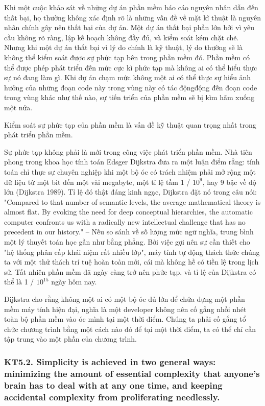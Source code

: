 \documentclass[12pt]{report}
\begin{document}

Khi một cuộc khảo sát về những dự án phần mềm báo cáo nguyên nhân dẫn đến thất bại, họ thường không xác định rõ là những vấn đề về mặt kĩ thuật là nguyên nhân chính gây nên thất bại của dự án. Một dự án thất bại phần lớn bởi vì yêu cầu không rõ ràng, lập kế hoạch không đầy đủ, và kiểm soát kém chặt chẽ. Nhưng khi một dự án thất bại vì lý do chính là kỹ thuật, lý do thường sẽ là không thể kiểm soát được sự phức tạp bên trong phần mềm đó. Phần mềm có thể được phép phát triển đến mức cực kì phức tạp mà không ai có thể hiểu thực sự nó đang làm gì. Khi dự án chạm mức không một ai có thể thực sự hiểu ảnh hưởng của những đoạn code này trong vùng này có tác độngđộng đến đoạn code trong vùng khác như thế nào, sự tiến triển của phần mềm sẽ bị kìm hãm xuống một nửa. 

Kiểm soát sự phức tạp của phần mềm là vấn đề kỹ thuật quan trọng nhất trong phát triển phần mềm.

Sự phức tạp không phải là mới trong công việc phát triển phần mềm. Nhà tiên phong trong khoa học tính toán Edsger Dijkstra đưa ra một luận điểm rằng: tính toán chỉ thực sự chuyên nghiệp khi một bộ óc có trách nhiệm phải mở rộng một dữ liệu từ một bit đến một vài megabyte, một tỉ lệ tầm 1 / $10^9$, hay 9 bậc về độ lớn (Dijkstra 1989). Tỉ lệ đó thật đáng kinh ngạc, Dijkstra đặt nó trong câu nói: "Compared to that number
of semantic levels, the average mathematical theory is almost flat. By evoking
the need for deep conceptual hierarchies, the automatic computer confronts us
with a radically new intellectual challenge that has no precedent in our history." -- Nếu so sánh về số lượng mức ngữ nghĩa, trung bình một lý thuyết toán học gần như bằng phẳng. Bởi việc gợi nên sự cần thiết cho "hệ thống phân cấp khái niệm rất nhiều lớp",  máy tính tự động thách thức chúng ta với một thử thách trí tuệ hoàn toàn mới, cái mà không hề có tiền lệ trong lịch sử. Tất nhiên phần mềm đã ngày càng trở nên phức tạp, và tỉ lệ của  Dijkstra có thể là 1 / $10^{15}$ ngày hôm nay. 

Dijkstra cho rằng không một ai có một bộ óc đủ lớn để chứa đựng một phần mềm máy tính hiện đại, nghĩa là một developer không nên cố gắng nhồi nhét toàn bộ phần mềm vào óc mình tại một thời điểm. Chúng ta phải cố gắng tổ chức chương trình bằng một cách nào đó để tại một thời điểm, ta có thể chỉ cần tập trung vào một phần của chương trình. 


\subsubsection{KT5.2. Simplicity is achieved in two general ways: minimizing the amount of essential complexity that anyone's brain has to deal with at any one time, and keeping accidental complexity from proliferating needlessly.}
\end{document}
